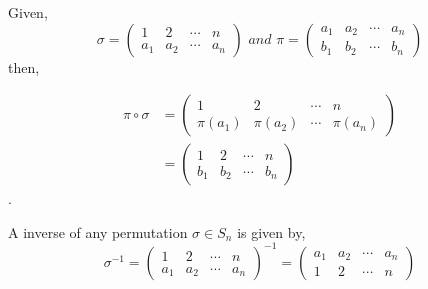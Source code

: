 Given,
\[
 \sigma =
 \begin{pmatrix}
  1 & 2 & \cdots & n \\
  a_1 & a_2 & \cdots & a_n
 \end{pmatrix}
 \, \, and \, \,
 \pi =
 \begin{pmatrix}
  a_1 & a_2 & \cdots & a_n \\
  b_1 & b_2 & \cdots & b_n
 \end{pmatrix}
\]
then,

\begin{align*}
 \pi \circ \sigma &=
 \begin{pmatrix}
  1 & 2 & \cdots & n \\
  \pi(a_1) & \pi(a_2) & \cdots & \pi(a_n)
 \end{pmatrix}
 \\
 &=
 \begin{pmatrix}
  1 & 2 & \cdots & n \\
  b_1 & b_2 & \cdots & b_n
 \end{pmatrix}
\end{align*}
.

A inverse of any permutation $\sigma \in S_n$ is given by,
\[
 \sigma^{-1} =
 \begin{pmatrix}
  1 & 2 & \cdots & n \\
  a_1 & a_2 & \cdots & a_n
 \end{pmatrix}^{-1}
 =
 \begin{pmatrix}
  a_1 & a_2 & \cdots & a_n \\
  1 & 2 & \cdots & n
 \end{pmatrix}
\]

